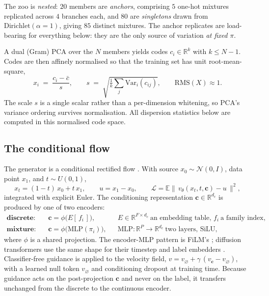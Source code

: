 The zoo is \emph{nested}: $20$ members are \emph{anchors}, comprising $5$ one-hot
mixtures replicated across $4$ branches each, and $80$ are \emph{singletons} drawn
from $\mathrm{Dirichlet}(\alpha{=}1)$, giving $85$ distinct mixtures. The anchor
replicates are load-bearing for everything below: they are the only source of
variation \emph{at fixed $\pi$}.

A dual (Gram) PCA over the $N$ members yields codes $c_i \in \mathbb{R}^{k}$ with
$k \le N-1$. Codes are then affinely normalised so that the training set has unit
root-mean-square,
%
\begin{equation}
x_i \;=\; \frac{c_i - \bar{c}}{s},
\qquad
s \;=\; \sqrt{\tfrac{1}{k}\textstyle\sum_j \mathrm{Var}_i(c_{ij})},
\qquad
\mathrm{RMS}(X) \approx 1 .
\end{equation}
%
The scale $s$ is a single scalar rather than a per-dimension whitening, so PCA's
variance ordering survives normalisation. All dispersion statistics below are
computed in this normalised code space.

\subsection{The conditional flow}
\label{app:flow}

The generator is a conditional rectified flow \cite{liu2022rectified,lipman2022flow}.
With source $x_0 \sim \mathcal{N}(0, I)$, data point $x_1$, and $t \sim U(0,1)$,
%
\begin{equation}
x_t = (1-t)\,x_0 + t\,x_1,
\qquad
u = x_1 - x_0,
\qquad
\mathcal{L} = \mathbb{E}\big\|\,v_\theta(x_t, t, \mathbf{c}) - u \,\big\|^2 ,
\end{equation}
%
integrated with explicit Euler. The conditioning representation
$\mathbf{c} \in \mathbb{R}^{d_c}$ is produced by one of two encoders:
%
\begin{align}
\textbf{discrete:}\quad & \mathbf{c} = \phi\big(E[\,f_i\,]\big),
  && E \in \mathbb{R}^{F \times d_c} \ \text{an embedding table, } f_i \ \text{a family index},\\
\textbf{mixture:}\quad  & \mathbf{c} = \phi\big(\mathrm{MLP}(\pi_i)\big),
  && \mathrm{MLP}: \mathbb{R}^{P} \to \mathbb{R}^{d_c} \ \text{two layers, SiLU},
\end{align}
%
where $\phi$ is a shared projection. The encoder-MLP pattern is
FiLM's \cite{perez2018film}; diffusion transformers use the same shape for their
timestep and label embedders \cite{peebles2023dit}. Classifier-free
guidance \cite{ho2022cfg} is applied to the velocity field,
$v = v_\varnothing + \gamma\,(v_{\mathbf{c}} - v_\varnothing)$, with a learned null
token $v_\varnothing$ and conditioning dropout at training time. Because guidance acts
on the post-projection $\mathbf{c}$ and never on the label, it transfers unchanged from
the discrete to the continuous encoder.


